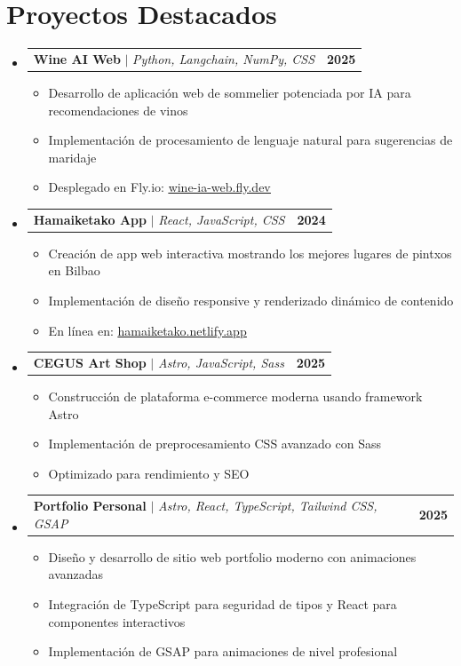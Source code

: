 \documentclass[letterpaper,11pt]{article}
\makeatletter
\newcommand{\resumeItem}[1]{
  \item\small{
    {#1 \vspace{-2pt}}
  }
}
\newcommand{\resumeProjectHeading}[2]{
    \item
    \begin{tabular*}{1.001\textwidth}{l@{\extracolsep{\fill}}r}
      \small#1 & \textbf{\small #2}\\
    \end{tabular*}\vspace{-7pt}
}
\newcommand{\resumeSubHeadingListStart}{\begin{itemize}[leftmargin=0.0in, label={}]}
\newcommand{\resumeSubHeadingListEnd}{\end{itemize}}
\newcommand{\resumeItemListStart}{\begin{itemize}}
\newcommand{\resumeItemListEnd}{\end{itemize}\vspace{-5pt}}
\makeatother
\begin{document}
\section{Proyectos Destacados}
    \vspace{-5pt}
    \resumeSubHeadingListStart
      \resumeProjectHeading
          {\textbf{Wine AI Web} $|$ \emph{Python, Langchain, NumPy, CSS}}{2025}
          \resumeItemListStart
            \resumeItem{Desarrollo de aplicación web de sommelier potenciada por IA para recomendaciones de vinos}
            \resumeItem{Implementación de procesamiento de lenguaje natural para sugerencias de maridaje}
            \resumeItem{Desplegado en Fly.io: \href{https://wine-ia-web.fly.dev/home}{\underline{wine-ia-web.fly.dev}}}
          \resumeItemListEnd
          \vspace{-13pt}
      \resumeProjectHeading
          {\textbf{Hamaiketako App} $|$ \emph{React, JavaScript, CSS}}{2024}
          \resumeItemListStart
            \resumeItem{Creación de app web interactiva mostrando los mejores lugares de pintxos en Bilbao}
            \resumeItem{Implementación de diseño responsive y renderizado dinámico de contenido}
            \resumeItem{En línea en: \href{https://hamaiketako.netlify.app/}{\underline{hamaiketako.netlify.app}}}
          \resumeItemListEnd 
          \vspace{-13pt}
      \resumeProjectHeading
          {\textbf{CEGUS Art Shop} $|$ \emph{Astro, JavaScript, Sass}}{2025}
          \resumeItemListStart
            \resumeItem{Construcción de plataforma e-commerce moderna usando framework Astro}
            \resumeItem{Implementación de preprocesamiento CSS avanzado con Sass}
            \resumeItem{Optimizado para rendimiento y SEO}
          \resumeItemListEnd 
          \vspace{-13pt}
      \resumeProjectHeading
          {\textbf{Portfolio Personal} $|$ \emph{Astro, React, TypeScript, Tailwind CSS, GSAP}}{2025}
          \resumeItemListStart
            \resumeItem{Diseño y desarrollo de sitio web portfolio moderno con animaciones avanzadas}
            \resumeItem{Integración de TypeScript para seguridad de tipos y React para componentes interactivos}
            \resumeItem{Implementación de GSAP para animaciones de nivel profesional}
          \resumeItemListEnd 
    \resumeSubHeadingListEnd
\vspace{-15pt}

\end{document}
